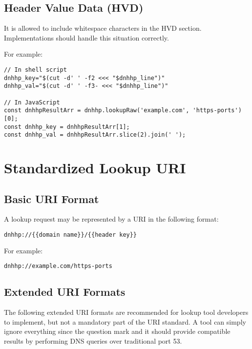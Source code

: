 \documentclass[a4paper,11pt]{article}
\begin{document}
\subsection{Header Value Data (HVD)}

It is allowed to include whitespace characters in the HVD section.
Implementations should handle this situation correctly.

For example:

\begin{lstlisting}
// In shell script
dnhhp_key="$(cut -d' ' -f2 <<< "$dnhhp_line")"
dnhhp_val="$(cut -d' ' -f3- <<< "$dnhhp_line")"

// In JavaScript
const dnhhpResultArr = dnhhp.lookupRaw('example.com', 'https-ports')[0];
const dnhhp_key = dnhhpResultArr[1];
const dnhhp_val = dnhhpResultArr.slice(2).join(' ');
\end{lstlisting}







\section{Standardized Lookup URI}

\subsection{Basic URI Format}

A lookup request may be represented by a URI in the following format:

\begin{lstlisting}
dnhhp://{{domain name}}/{{header key}}
\end{lstlisting}

For example:

\begin{lstlisting}
dnhhp://example.com/https-ports
\end{lstlisting}

\subsection{Extended URI Formats}

The following extended URI formats are recommended for lookup tool developers to implement,
but not a mandatory part of the URI standard.
A tool can simply ignore everything since the question mark and it should provide compatible results
by performing DNS queries over traditional port 53.
\end{document}
